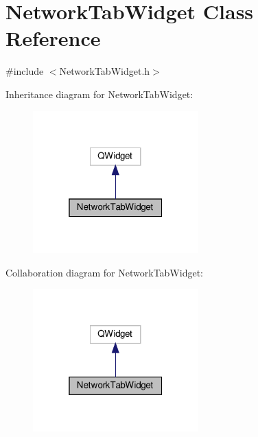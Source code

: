 \hypertarget{class_network_tab_widget}{}\section{Network\+Tab\+Widget Class Reference}
\label{class_network_tab_widget}


{\ttfamily \#include $<$Network\+Tab\+Widget.\+h$>$}



Inheritance diagram for Network\+Tab\+Widget\+:
\nopagebreak
\begin{figure}[H]
\begin{center}
\leavevmode
\includegraphics[width=181pt]{class_network_tab_widget__inherit__graph}
\end{center}
\end{figure}


Collaboration diagram for Network\+Tab\+Widget\+:
\nopagebreak
\begin{figure}[H]
\begin{center}
\leavevmode
\includegraphics[width=181pt]{class_network_tab_widget__coll__graph}
\end{center}
\end{figure}
